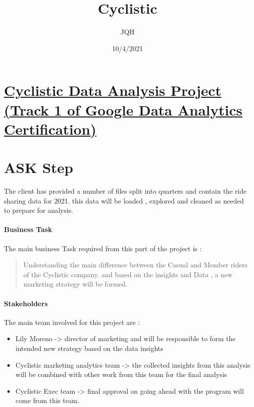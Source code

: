 \documentclass[
]{article}
\title{Cyclistic}
\author{JQH}
\date{10/4/2021}
\begin{document}
\maketitle

\hypertarget{cyclistic-data-analysis-project-track-1-of-google-data-analytics-certification}{%
\section{\texorpdfstring{\underline{\textbf{Cyclistic Data Analysis
Project (Track 1 of Google Data Analytics
Certification)}}}{Cyclistic Data Analysis Project (Track 1 of Google Data Analytics Certification)}}\label{cyclistic-data-analysis-project-track-1-of-google-data-analytics-certification}}

\hypertarget{ask-step}{%
\section{ASK Step}\label{ask-step}}

The client has provided a number of files split into quarters and
contain the ride sharing data for 2021. this data will be loaded ,
explored and cleaned as needed to prepare for analysis.

\hypertarget{business-task}{%
\paragraph{Business Task}\label{business-task}}

The main business Task required from this part of the project is :

\begin{quote}
Understanding the main difference between the Casual and Member riders
of the Cyclistic company. and based on the insights and Data , a new
marketing strategy will be formed.
\end{quote}

\hypertarget{stakeholders}{%
\paragraph{Stakeholders}\label{stakeholders}}

The main team involved for this project are :

\begin{itemize}
\item
  Lily Moreno -\textgreater{} director of marketing and will be
  responsible to form the intended new strategy based on the data
  insights
\item
  Cyclistic marketing analytics team -\textgreater{} the collected
  insights from this analysis will be combined with other work from this
  team for the final analysis
\item
  Cyclistic Exec team -\textgreater{} final approval on going ahead with
  the program will come from this team.
\end{itemize}
\end{document}
